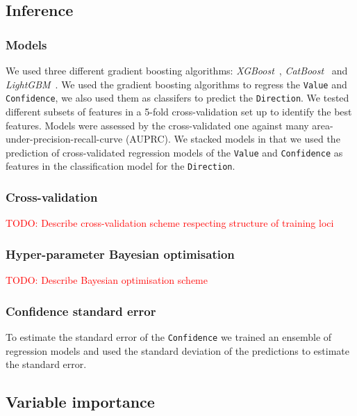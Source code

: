 \documentclass{article}
\newcommand{\todo}[1]{\textcolor{red}{TODO: #1}}
\begin{document}
\subsection*{Inference}


\subsubsection*{Models}

We used three different gradient boosting algorithms:
\emph{XGBoost}~\cite{ChenXGBoostScalableTree2016},
\emph{CatBoost}~\cite{ProkhorenkovaCatBoostunbiasedboosting2017} and
\emph{LightGBM}~\cite{KeLightGBMHighlyEfficient2017}. We used the gradient
boosting algorithms to regress the \texttt{Value} and \texttt{Confidence}, we
also used them as classifers to predict the \texttt{Direction}. We tested
different subsets of features in a 5-fold cross-validation set up to identify
the best features.  Models were assessed by the cross-validated one against
many area-under-precision-recall-curve (AUPRC). We stacked models in that we
used the prediction of cross-validated regression models of the \texttt{Value}
and \texttt{Confidence} as features in the classification model for the
\texttt{Direction}.

\subsubsection*{Cross-validation}

\todo{Describe cross-validation scheme respecting structure of training loci}



\subsubsection*{Hyper-parameter Bayesian optimisation}

\todo{Describe Bayesian optimisation scheme}


\subsubsection*{Confidence standard error}

To estimate the standard error of the \texttt{Confidence} we trained an
ensemble of regression models and used the standard deviation of the
predictions to estimate the standard error.


\subsection*{Variable importance}
\end{document}
